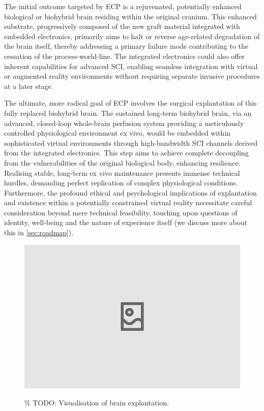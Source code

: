 \documentclass[10pt]{article}
\begin{document}
\begin{sloppypar}
  The initial outcome targeted by ECP is a rejuvenated, potentially enhanced biological or biohybrid brain residing within the original cranium. This enhanced substrate, progressively composed of the new graft material integrated with embedded electronics, primarily aims to halt or reverse age-related degradation of the brain itself, thereby addressing a primary failure mode contributing to the cessation of the process-world-line. The integrated electronics could also offer inherent capabilities for advanced SCI, enabling seamless integration with virtual or augmented reality environments without requiring separate invasive procedures at a later stage.

  The ultimate, more radical goal of ECP involves the surgical explantation of this fully replaced biohybrid brain. The sustained long-term biohybrid brain, via an advanced, closed-loop whole-brain perfusion system providing a meticulously controlled physiological environment ex vivo, would be embedded within sophisticated virtual environments through high-bandwidth SCI channels derived from the integrated electronics. This step aims to achieve complete decoupling from the vulnerabilities of the original biological body, enhancing resilience. Realising stable, long-term ex vivo maintenance presents immense technical hurdles, demanding perfect replication of complex physiological conditions. Furthermore, the profound ethical and psychological implications of explantation and existence within a potentially constrained virtual reality necessitate careful consideration beyond mere technical feasibility, touching upon questions of identity, well-being and the nature of experience itself (we discuss more about this in \autoref{sec:roadmap}).

  \begin{figure}[ht]
    \centering
    \includegraphics[width=\textwidth]{figures/ecp-brain-explant.png}
    \label{fig:ecp-brain-explant}
    \caption{\% TODO: Visualisation of brain explantation.}
  \end{figure}


\end{sloppypar}
\end{document}
